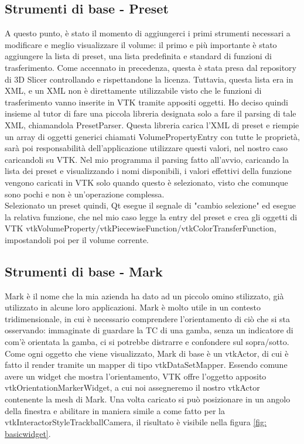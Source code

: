 \subsection{Strumenti di base - Preset}
A questo punto, è stato il momento di aggiungerci i primi strumenti necessari a modificare e meglio visualizzare il volume: il primo e più importante è stato aggiungere la lista di preset, una lista predefinita e standard di funzioni di trasferimento. Come accennato in precedenza, questa è stata presa dal repository di 3D Slicer controllando e rispettandone la licenza. Tuttavia, questa lista era in XML, e un XML non è direttamente utilizzabile visto che le funzioni di trasferimento vanno inserite in VTK tramite appositi oggetti. Ho deciso quindi insieme al tutor di fare una piccola libreria designata solo a fare il parsing di tale XML, chiamandola PresetParser. Questa libreria carica l'XML di preset e riempie un array di oggetti generici chiamati VolumePropertyEntry con tutte le proprietà, sarà poi responsabilità dell'applicazione utilizzare questi valori, nel nostro caso caricandoli su VTK. Nel mio programma il parsing fatto all'avvio, caricando la lista dei preset e visualizzando i nomi disponibili, i valori effettivi della funzione vengono caricati in VTK solo quando questo è selezionato, visto che comunque sono pochi e non è un'operazione complessa.
\\
Selezionato un preset quindi, Qt esegue il segnale di "cambio selezione" ed esegue la relativa funzione, che nel mio caso legge la entry del preset e crea gli oggetti di VTK vtkVolumeProperty/vtkPiecewiseFunction/vtkColorTransferFunction, impostandoli poi per il volume corrente.

\subsection{Strumenti di base - Mark}
Mark è il nome che la mia azienda ha dato ad un piccolo omino stilizzato, già utilizzato in alcune loro applicazioni. Mark è molto utile in un contesto tridimensionale, in cui è necessario comprendere l'orientamento di ciò che si sta osservando: immaginate di guardare la TC di una gamba, senza un indicatore di com'è orientata la gamba, ci si potrebbe distrarre e confondere sul sopra/sotto. Come ogni oggetto che viene visualizzato, Mark di base è un vtkActor, di cui è fatto il render tramite un mapper di tipo vtkDataSetMapper. Essendo comune avere un widget che mostra l'orientamento, VTK offre l'oggetto apposito vtkOrientationMarkerWidget, a cui noi assegneremo il nostro vtkActor contenente la mesh di Mark. Una volta caricato si può posizionare in un angolo della finestra e abilitare in maniera simile a come fatto per la vtkInteractorStyleTrackballCamera, il risultato è visibile nella figura \ref{fig: basicwidget}.

